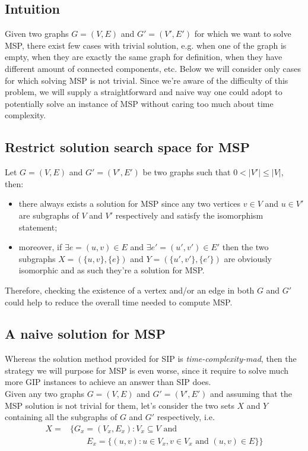 \documentclass[a4paper,12pt]{article}
\theoremstyle{newplanestyle}
\theoremstyle{newdefinitionstyle}
\theoremstyle{newprovestyle}
\begin{document}
\subsection{Intuition}
Given two graphs $G=(V,E)$ and $G'=(V',E')$ for which we want to solve MSP, there exist few cases with trivial solution, e.g. when one of the graph is empty, when they are exactly the same graph for definition, when they have different amount of connected components, etc. Below we will consider only cases for which solving MSP is not trivial. Since we're aware of the difficulty of this problem, we will supply a straightforward and naive way one could adopt to potentially solve an instance of MSP without caring too much about time complexity. 

\subsection{Restrict solution search space for MSP}
Let $G=(V,E)$ and $G'=(V',E')$ be two graphs such that $0 < |V'| \leq |V|$, then:
\begin{itemize}
	\item there always exists a solution for MSP since any two vertices $v \in V$ and $u \in V'$ are subgraphs of $V$ and $V'$ respectively and satisfy the isomorphism statement;
	\item moreover, if $\exists e=(u,v) \in E$ and $\exists e'=(u',v') \in E'$ then the two subgraphs $X = (\{u,v\}, \{e\})$ and $Y = (\{u',v'\}, \{e'\})$ are obviously isomorphic and as such they're a solution for MSP.  
\end{itemize}
Therefore, checking the existence of a vertex and/or an edge in both $G$ and $G'$ could help to reduce the overall time needed to compute MSP.

\subsection{A naive solution for MSP}
Whereas the solution method provided for SIP is \textit{time-complexity-mad}, then the strategy we will purpose for MSP is even worse, since it require to solve much more GIP instances to achieve an answer than SIP does.
\\

Given any two graphs $G=(V,E)$ and $G'=(V',E')$ and assuming that the MSP solution is not trivial for them, let's consider the two sets $X$ and $Y$ containing all the subgraphs of $G$ and $G'$ respectively, i.e.
\[
\begin{split}
X = & \{G_x=(V_x, E_x) : V_x \subseteq V \text{ and }\\
& \qquad E_x = \{(u,v) : u \in V_x, v \in V_x \text{ and } (u,v) \in E \}\}
\end{split}
\]
\end{document}
